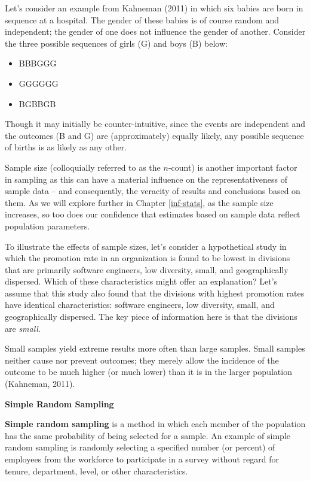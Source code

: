 \documentclass[
]{book}
\providecommand{\tightlist}{%
  \setlength{\itemsep}{0pt}\setlength{\parskip}{0pt}}
\begin{document}
Let's consider an example from Kahneman (2011) in which six babies are born in sequence at a hospital. The gender of these babies is of course random and independent; the gender of one does not influence the gender of another. Consider the three possible sequences of girls (G) and boys (B) below:

\begin{itemize}
\tightlist
\item
  BBBGGG
\item
  GGGGGG
\item
  BGBBGB
\end{itemize}

Though it may initially be counter-intuitive, since the events are independent and the outcomes (B and G) are (approximately) equally likely, any possible sequence of births is as likely as any other.

Sample size (colloquially referred to as the \(n\)-count) is another important factor in sampling as this can have a material influence on the representativeness of sample data -- and consequently, the veracity of results and conclusions based on them. As we will explore further in Chapter \ref{inf-stats}, as the sample size increases, so too does our confidence that estimates based on sample data reflect population parameters.

To illustrate the effects of sample sizes, let's consider a hypothetical study in which the promotion rate in an organization is found to be lowest in divisions that are primarily software engineers, low diversity, small, and geographically dispersed. Which of these characteristics might offer an explanation? Let's assume that this study also found that the divisions with highest promotion rates have identical characteristics: software engineers, low diversity, small, and geographically dispersed. The key piece of information here is that the divisions are \emph{small}.

Small samples yield extreme results more often than large samples. Small samples neither cause nor prevent outcomes; they merely allow the incidence of the outcome to be much higher (or much lower) than it is in the larger population (Kahneman, 2011).

\textbf{Simple Random Sampling}

\textbf{Simple random sampling} is a method in which each member of the population has the same probability of being selected for a sample. An example of simple random sampling is randomly selecting a specified number (or percent) of employees from the workforce to participate in a survey without regard for tenure, department, level, or other characteristics.
\end{document}
